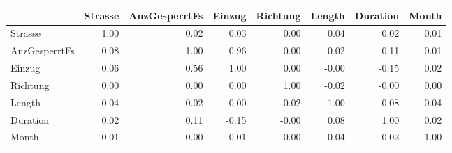 \begin{tabular}{lrrrrrrr}
\toprule
{} &  Strasse &  AnzGesperrtFs &  Einzug &  Richtung &  Length &  Duration &  Month \\
\midrule
Strasse       &     1.00 &           0.02 &    0.03 &      0.00 &    0.04 &      0.02 &   0.01 \\
AnzGesperrtFs &     0.08 &           1.00 &    0.96 &      0.00 &    0.02 &      0.11 &   0.01 \\
Einzug        &     0.06 &           0.56 &    1.00 &      0.00 &   -0.00 &     -0.15 &   0.02 \\
Richtung      &     0.00 &           0.00 &    0.00 &      1.00 &   -0.02 &     -0.00 &   0.00 \\
Length        &     0.04 &           0.02 &   -0.00 &     -0.02 &    1.00 &      0.08 &   0.04 \\
Duration      &     0.02 &           0.11 &   -0.15 &     -0.00 &    0.08 &      1.00 &   0.02 \\
Month         &     0.01 &           0.00 &    0.01 &      0.00 &    0.04 &      0.02 &   1.00 \\
\bottomrule
\end{tabular}
